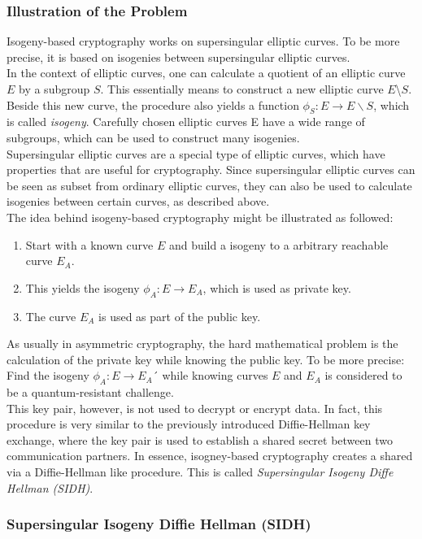\subsubsection{Illustration of the Problem}
Isogeny-based cryptography works on supersingular elliptic curves. To be more precise, it is based on isogenies between supersingular elliptic curves.
\\
In the context of elliptic curves, one can calculate a quotient of an elliptic curve $E$ by a subgroup $S$. This essentially means to construct a new elliptic curve $E$\textbackslash $S$.
Beside this new curve, the procedure also yields a function $\phi_S: E \to E \backslash S$, which is called \textit{isogeny}. Carefully chosen elliptic curves E have a wide range of subgroups, which can be used to construct many isogenies.
\\
Supersingular elliptic curves are a special type of elliptic curves, which have properties that are useful for cryptography. Since supersingular elliptic curves can be seen as subset from ordinary elliptic curves, they can also be used to calculate isogenies between certain curves, as described above.
\\
The idea behind isogeny-based cryptography might be illustrated as followed:

\begin{enumerate}
\item Start with a known curve $E$ and build a isogeny to a arbitrary reachable curve $E_A$.
\item This yields the isogeny $\phi_A: E \to E_A$, which is used as private key.
\item The curve $E_A$ is used as part of the public key.
\end{enumerate}
As usually in asymmetric cryptography, the hard mathematical problem is the calculation of the private key while knowing the public key. To be more precise: Find the isogeny $\phi_A: E \to E_A$´ while knowing curves $E$ and $E_A$ is considered to be a quantum-resistant challenge.
\\
This key pair, however, is not used to decrypt or encrypt data. In fact, this procedure is very similar to the previously introduced Diffie-Hellman key exchange, where the key pair is used to establish a shared secret between two communication partners.
In essence, isogney-based cryptography creates a shared via a Diffie-Hellman like procedure. This is called \textit{Supersingular Isogeny Diffe Hellman (SIDH)}.

\subsubsection{Supersingular Isogeny Diffie Hellman (SIDH)}
